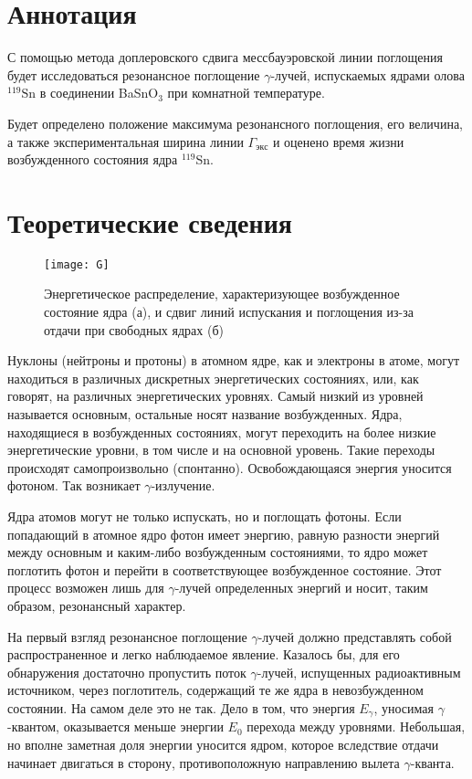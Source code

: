 \documentclass[a4paper, 12pt]{article}
\begin{document}

\section{Аннотация}
С помощью метода доплеровского сдвига мессбауэровской линии поглощения
будет исследоваться резонансное поглощение $\gamma$-лучей, испускаемых
ядрами олова $^{\text{119}}\text{Sn}$ в соединении BaSnO$_{3}$ при
комнатной температуре.

Будет определено положение максимума резонансного поглощения, его
величина, а также экспериментальная ширина линии $\Gamma_{экс}$ и
оценено время жизни возбужденного состояния ядра $^\text{119}$Sn.






\section{Теоретические сведения}

	\begin{wrapfigure}[18]{r}{0.35\linewidth}
		\texttt{[image: G]}
		\caption{Энергетическое распределение, характеризующее возбужденное состояние ядра (а),
			и сдвиг линий испускания и поглощения из-за отдачи при свободных ядрах (б)}
		\label{ris 1}
	\end{wrapfigure}

Нуклоны (нейтроны и протоны) в атомном ядре, как и электроны
	в атоме, могут находиться в различных дискретных энергетических
	состояниях, или, как говорят, на различных энергетических уровнях.
	Самый низкий из уровней называется основным, остальные носят название возбужденных. Ядра, находящиеся в возбужденных состояниях, могут переходить на более низкие энергетические уровни, в том
	числе и на основной уровень. Такие переходы происходят самопроизвольно (спонтанно). Освобождающаяся энергия уносится фотоном.
	Так возникает $ \gamma $-излучение.

	Ядра атомов могут не только испускать, но и поглощать фотоны. Если попадающий в атомное ядро фотон имеет
	энергию, равную разности энергий между основным и каким-либо возбужденным состояниями, то ядро может поглотить фотон и перейти в соответствующее возбужденное состояние. Этот процесс возможен лишь для $ \gamma $-лучей определенных энергий и носит, таким образом, резонансный характер.

	На первый взгляд резонансное поглощение  $ \gamma $-лучей должно представлять собой распространенное и легко наблюдаемое явление. Казалось бы, для его обнаружения достаточно пропустить поток $ \gamma $-лучей,
	испущенных радиоактивным источником, через поглотитель, содержащий те же ядра в невозбужденном состоянии. На самом деле это не так. Дело в том, что энергия $E_\gamma $, уносимая $ \gamma $-квантом, оказывается
	меньше энергии $ E_0 $ перехода между уровнями. Небольшая, но вполне
	заметная доля энергии уносится ядром, которое вследствие отдачи начинает двигаться в сторону, противоположную направлению вылета
	$ \gamma $-кванта.
\end{document}
